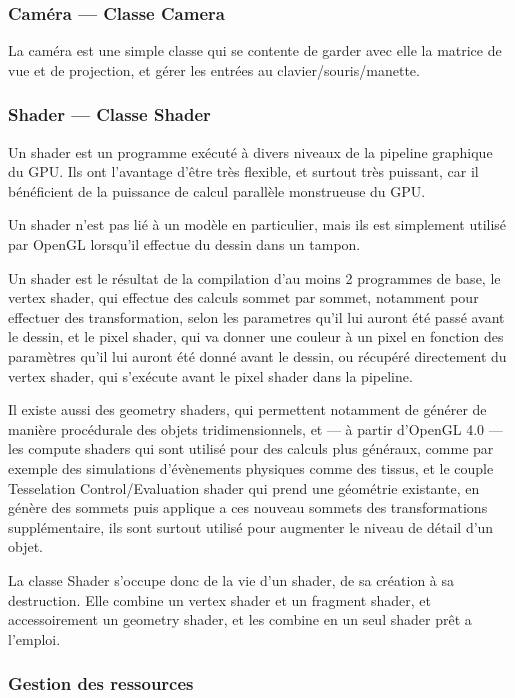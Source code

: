 \documentclass[11pt, a4paper, titlepage]{article}
\begin{document}
\subsubsection{Caméra --- Classe Camera}

La caméra est une simple classe qui se contente de garder avec elle la matrice de vue et de projection, et gérer les entrées au clavier/souris/manette.

\subsubsection{Shader --- Classe Shader}

Un shader est un programme exécuté à divers niveaux de la pipeline graphique du GPU.
Ils ont l'avantage d'être très flexible, et surtout très puissant, car il bénéficient de la puissance de calcul parallèle monstrueuse du GPU.

Un shader n'est pas lié à un modèle en particulier, mais ils est simplement utilisé par OpenGL lorsqu'il effectue du dessin dans un tampon.

Un shader est le résultat de la compilation d'au moins 2 programmes de base, le vertex shader, qui effectue des calculs sommet par sommet,
notamment pour effectuer des transformation, selon les parametres qu'il lui auront été passé avant le dessin, et le pixel shader, qui va
 donner une couleur à un pixel en fonction des paramètres qu'il lui auront été donné avant le dessin, ou récupéré directement du vertex shader, qui
s'exécute avant le pixel shader dans la pipeline.

Il existe aussi des geometry shaders, qui permettent notamment de générer de manière procédurale des objets tridimensionnels, et
 --- à partir d'OpenGL 4.0 --- les compute shaders qui sont utilisé pour des calculs plus généraux, comme par exemple des 
simulations d'évènements physiques comme des tissus, et le couple Tesselation Control/Evaluation shader qui prend une géométrie existante, en génère des sommets
puis applique a ces nouveau sommets des transformations supplémentaire, ils sont surtout utilisé pour augmenter le niveau de détail d'un objet.

La classe Shader s'occupe donc de la vie d'un shader, de sa création à sa destruction.
Elle combine un vertex shader et un fragment shader, et accessoirement un geometry shader, et les combine en un seul shader prêt a l'emploi. 

\subsubsection{Gestion des ressources}
\end{document}
